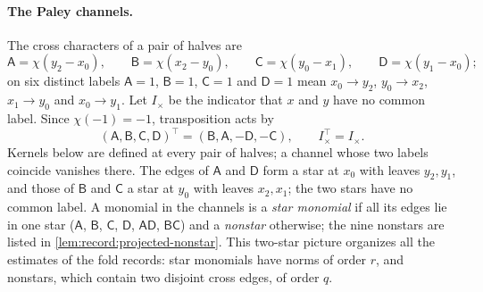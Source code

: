 \paragraph{The Paley channels.}
The cross characters of a pair of halves are
\begin{equation}\label{eq:middle:channels}
 \mathsf A=\chi(y_2-x_0),\qquad\mathsf B=\chi(x_2-y_0),\qquad
 \mathsf C=\chi(y_0-x_1),\qquad\mathsf D=\chi(y_1-x_0);
\end{equation}
on six distinct labels $\mathsf A=1$, $\mathsf B=1$, $\mathsf C=1$ and
$\mathsf D=1$ mean $x_0\to y_2$, $y_0\to x_2$, $x_1\to y_0$ and $x_0\to y_1$.
Let $I_\times$ be the indicator that $x$ and $y$ have no common label. Since
$\chi(-1)=-1$, transposition acts by
\begin{equation}\label{eq:middle:transpose}
 (\mathsf A,\mathsf B,\mathsf C,\mathsf D)^\top
 =(\mathsf B,\mathsf A,-\mathsf D,-\mathsf C),\qquad I_\times^\top=I_\times .
\end{equation}
Kernels below are defined at every pair of halves; a channel whose two labels
coincide vanishes there. The edges of $\mathsf A$ and $\mathsf D$ form a star
at $x_0$ with leaves $y_2,y_1$, and those of $\mathsf B$ and $\mathsf C$ a star
at $y_0$ with leaves $x_2,x_1$; the two stars have no common label. A monomial
in the channels is a \emph{star monomial} if all its edges lie in one star
($\mathsf A$, $\mathsf B$, $\mathsf C$, $\mathsf D$, $\mathsf A\mathsf D$,
$\mathsf B\mathsf C$) and a \emph{nonstar} otherwise; the nine nonstars are
listed in \cref{lem:record:projected-nonstar}. This two-star picture organizes
all the estimates of the fold records: star monomials have norms of order $r$,
and nonstars, which contain two disjoint cross edges, of order $q$.

